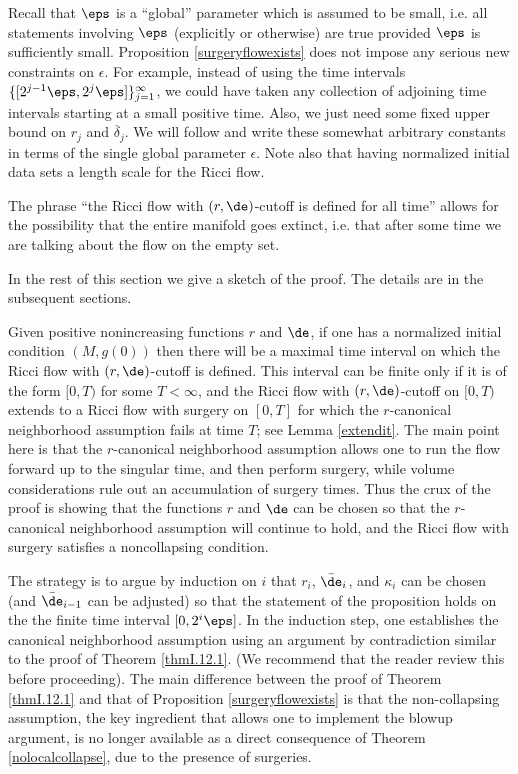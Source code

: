 Recall that
$\eps$ is a ``global'' parameter which is assumed to be
small, i.e. all statements involving $\eps$ (explicitly or
otherwise) are true provided $\eps$ is sufficiently small.
Proposition \ref{surgeryflowexists} does not impose any
serious new constraints on $\epsilon$.
For example, instead of using the time intervals
$\{[2^{j-1}\eps,2^j\eps]\}_{j=1}^\infty$,
we could have taken any collection of adjoining time intervals
starting at a small positive time. Also, we just need some
fixed upper bound on $r_j$ and $\overline{\delta}_j$.
We will follow \cite{Perelman2} and write these somewhat
arbitrary constants in terms of the single global parameter $\epsilon$.
Note also that having normalized initial data sets a length
scale for the Ricci flow.

The phrase ``the Ricci flow with $(r,\de)$-cutoff
is defined for all time'' allows for the possibility that the entire
manifold goes extinct, i.e. that after some time we are talking
about the flow on the empty set.

In the rest of this section we give a sketch of the proof.  The details
are in the subsequent sections.

Given positive nonincreasing functions $r$ and $\de$,
if one has a normalized initial condition $(M,g(0))$ then there
will be a maximal time interval on which the Ricci flow with
$(r,\de)$-cutoff is defined.   This interval can be finite
only if it is of the form $[0,T)$ for some $T<\infty$, and the
Ricci flow with $(r,\de)$-cutoff on $[0,T)$ extends to a Ricci flow with surgery
on $[0,T]$ for which the $r$-canonical neighborhood
assumption fails at time $T$; see Lemma \ref{extendit}. The main point
here is that the $r$-canonical neighborhood assumption
allows one to run the flow forward up to the singular time, and then perform
surgery, while volume considerations rule out an accumulation of
surgery times.   Thus the crux of the proof is showing that the
functions $r$
and $\de$ can be chosen so that the $r$-canonical neighborhood assumption
will continue to hold, and the Ricci flow with surgery
satisfies a noncollapsing
condition.

The strategy is to  argue
by induction on $i$ that $r_i$, $\bar\de_i$, and $\kappa_i$
can be chosen (and $\bar\de_{i-1}$ can be adjusted)
so that the statement of the proposition holds on the
the finite time interval $[0,2^i\eps]$.
In the induction step, one establishes the canonical
neighborhood assumption using an argument by contradiction similar
to the proof of Theorem \ref{thmI.12.1}. (We recommend that the reader review this
before proceeding).   The main difference between the proof of
Theorem \ref{thmI.12.1} and that of Proposition \ref{surgeryflowexists} is that the
non-collapsing assumption, the key ingredient
that allows one to implement the blowup
argument, is no longer available as a direct consequence of Theorem \ref{nolocalcollapse},
due to the presence of surgeries.

